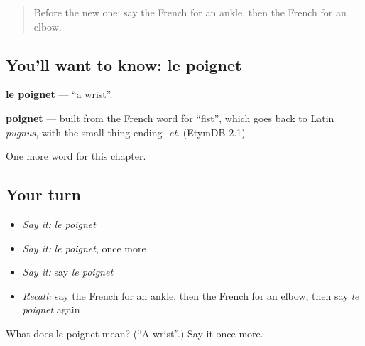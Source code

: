 \begin{quote}
Before the new one: say the French for an ankle, then the French for an elbow.
\end{quote}

\subsection*{You'll want to know: le poignet}
\textbf{le poignet} — \textquotedblleft{}a wrist\textquotedblright{}.

\begin{cousinweb}
\textbf{poignet} — built from the French word for \textquotedblleft{}fist\textquotedblright{}, which goes back to Latin \emph{pugnus}, with the small-thing ending \emph{-et}. (EtymDB 2.1)
\end{cousinweb}

\begin{grammarlens}[title={What you've built}]
One more word for this chapter.
\end{grammarlens}

\subsection*{Your turn}
\begin{itemize}
\raggedright
  \item \emph{Say it:} \emph{le poignet}
  \item \emph{Say it:} \emph{le poignet}, once more
  \item \emph{Say it:} say \emph{le poignet}
  \item \emph{Recall:} say the French for an ankle, then the French for an elbow, then say \emph{le poignet} again
\end{itemize}

\begin{tcolorbox}[breakable,colback=teal!4,colframe=teal!35!black,title={Before you move on}]
What does le poignet mean? (\textquotedblleft{}A wrist\textquotedblright{}.) Say it once more.
\end{tcolorbox}
